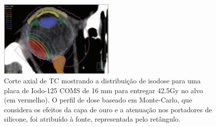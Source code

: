 \documentclass[11pt,a4paper]{article}
\begin{document}
    \begin{figure}[h]
        \centering
        \includegraphics[width=0.5\textwidth]{Imagens/distribDosePlacaComsI125.JPG}
        \caption{Corte axial de TC mostrando a distribuição de isodose para uma placa de Iodo-125 COMS de 16 mm para entregar 42.5Gy no alvo (em vermelho). O perfil de dose baseado em Monte-Carlo, que considera os efeitos da capa de ouro e a atenuação nos portadores de silicone, foi atribuído à fonte, representada pelo retângulo.}
    \end{figure}
 

\end{document}
